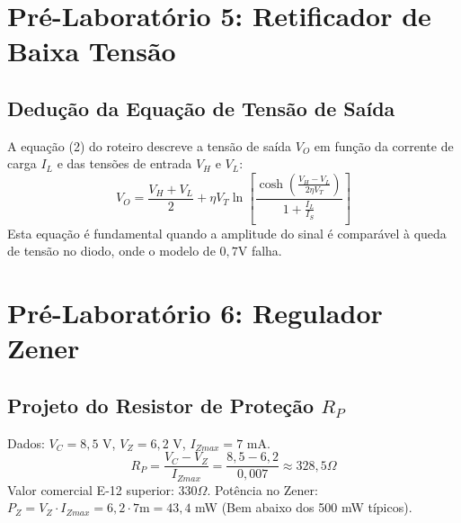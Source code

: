 \documentclass[12pt,a4paper]{article}
\begin{document}
\section{Pré-Laboratório 5: Retificador de Baixa Tensão}

\subsection{Dedução da Equação de Tensão de Saída}
A equação (2) do roteiro descreve a tensão de saída $V_O$ em função da corrente de carga $I_L$ e das tensões de entrada $V_H$ e $V_L$:
\begin{equation}
V_O = \frac{V_H + V_L}{2} + \eta V_T \ln \left[ \frac{\cosh(\frac{V_H - V_L}{2 \eta V_T})}{1 + \frac{I_L}{I_S}} \right]
\end{equation}
Esta equação é fundamental quando a amplitude do sinal é comparável à queda de tensão no diodo, onde o modelo de $0,7$V falha.

\section{Pré-Laboratório 6: Regulador Zener}

\subsection{Projeto do Resistor de Proteção $R_P$}
Dados: $V_C = 8,5$ V, $V_Z = 6,2$ V, $I_{Zmax} = 7$ mA.
\begin{equation}
R_P = \frac{V_C - V_Z}{I_{Zmax}} = \frac{8,5 - 6,2}{0,007} \approx 328,5 \Omega
\end{equation}
Valor comercial E-12 superior: \textbf{$330 \Omega$}.
Potência no Zener: $P_Z = V_Z \cdot I_{Zmax} = 6,2 \cdot 7\text{m} = 43,4$ mW (Bem abaixo dos 500 mW típicos).
\end{document}
